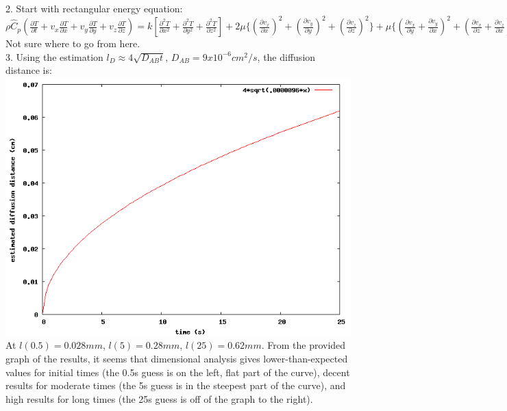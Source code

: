 \documentclass{article}
\begin{document}
2. Start with rectangular energy equation: \\
$\rho\hat{C}_{p} ( \frac{\partial T}{\partial t} + v_{x}\frac{\partial T}{\partial x} + v_{y}\frac{\partial T}{\partial y} + v_{z}\frac{\partial T}{\partial z} ) = k [ \frac{\partial^{2} T}{\partial x^{2}} + \frac{\partial^{2} T}{\partial y^{2}} + \frac{\partial^{2} T}{\partial z^{2}} ] + 2 \mu \{ ( \frac{\partial v_{x}}{\partial x} )^{2} + ( \frac{\partial v_{y}}{\partial y} )^{2} + ( \frac{\partial v_{z}}{\partial z} )^{2} \} + \mu \{ ( \frac{\partial v_{x}}{\partial y} + \frac{\partial v_{y}}{\partial x} )^{2} + ( \frac{\partial v_{x}}{\partial z} + \frac{\partial v_{z}}{\partial x} )^{2} + ( \frac{\partial v_{y}}{\partial z} + \frac{\partial v_{z}}{\partial y} )^{2} \}$ \\
Not sure where to go from here. \\

3. Using the estimation $\textit{l}_{D} \approx 4\sqrt{\textit{D}_{AB}t}$, $\textit{D}_{AB} = 9x10^{-6}cm^{2}/s$, the diffusion distance is: \\
\includegraphics[width=0.5\linewidth]{diffdist} \\
At $l(0.5) = 0.028mm$, $l(5) = 0.28mm$, $l(25) = 0.62mm$. From the provided graph of the results, it seems that dimensional analysis gives lower-than-expected values for initial times (the 0.5s guess is on the left, flat part of the curve), decent results for moderate times (the 5s guess is in the steepest part of the curve), and high results for long times (the 25s guess is off of the graph to the right). \\
\end{document}

